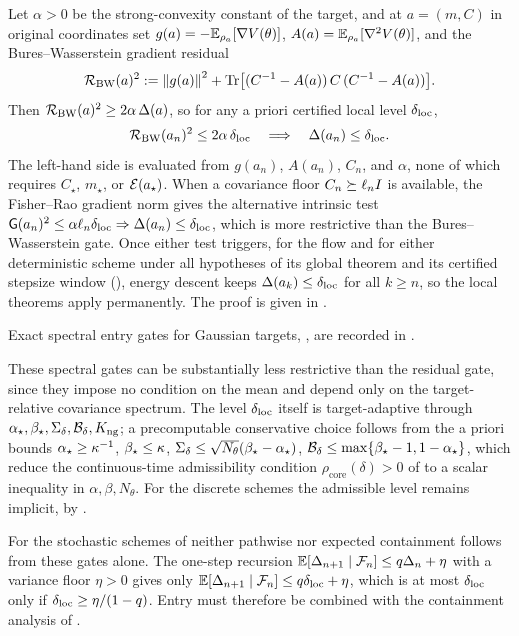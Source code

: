 \begin{proposition}
\label{prop:entry-residual}
Let $\alpha>0$ be the strong-convexity constant of the target, and at $a=(m,C)$ in original
coordinates set $g(a)=-\mathbb{E}_{\rho_a}[\nabla V(\theta)]$, $A(a)=\mathbb{E}_{\rho_a}[\nabla^2V(\theta)]$,
and the Bures--Wasserstein gradient residual
\[
    \mathcal R_{\mathrm{BW}}(a)^2
    :=\left\lVert g(a)\right\rVert^2+\operatorname{Tr}\bigl[(C^{-1}-A(a))\,C\,(C^{-1}-A(a))\bigr].
\]
Then $\mathcal R_{\mathrm{BW}}(a)^2\geq2\alpha\,\Delta(a)$, so for any a priori certified local level
$\delta_{\mathrm{loc}}$,
\[
    \mathcal R_{\mathrm{BW}}(a_n)^2\leq2\alpha\,\delta_{\mathrm{loc}}
    \quad\Longrightarrow\quad
    \Delta(a_n)\leq\delta_{\mathrm{loc}}.
\]
The left-hand side is evaluated from $g(a_n)$, $A(a_n)$, $C_n$, and $\alpha$, none of which
requires $C_\star$, $m_\star$, or $\mathcal{E}(a_\star)$. When a covariance floor $C_n\succeq\ell_nI$
is available, the Fisher--Rao gradient norm gives the alternative intrinsic test
$\mathsf{G}(a_n)^2\leq\alpha\ell_n\delta_{\mathrm{loc}}\Rightarrow\Delta(a_n)\leq\delta_{\mathrm{loc}}$, which
is more restrictive than the Bures--Wasserstein gate. Once either test triggers, for the flow
and for either deterministic scheme under all hypotheses of its global theorem and its
certified stepsize window (), energy descent
keeps $\Delta(a_k)\leq\delta_{\mathrm{loc}}$ for all $k\geq n$, so the local theorems apply
permanently. The proof is given in .
\end{proposition}

Exact spectral entry gates for Gaussian targets, , are recorded in
.

These spectral gates can be substantially less restrictive than the residual gate, since they
impose no condition on the mean and depend only on the target-relative covariance spectrum. The
level $\delta_{\mathrm{loc}}$ itself is target-adaptive through
$\alpha_\star,\beta_\star,\Sigma_\delta,\mathcal B_\delta,K_{\mathrm{ng}}$; a precomputable conservative choice
follows from the a priori bounds $\alpha_\star\geq\kappa^{-1}$, $\beta_\star\leq\kappa$,
$\Sigma_\delta\leq\sqrt{N_\theta}(\beta_\star-\alpha_\star)$,
$\mathcal B_\delta\leq\max\{\beta_\star-1,1-\alpha_\star\}$, which reduce the continuous-time
admissibility condition $\rho_{\mathrm{core}}(\delta)>0$ of  to a scalar
inequality in $\alpha,\beta,N_\theta$. For the discrete schemes the admissible level remains
implicit, by .

For the stochastic schemes of  neither pathwise nor expected containment
follows from these gates alone. The one-step recursion
$\mathbb{E}[\Delta_{n+1}\mid\mathcal{F}_n]\leq q\Delta_n+\eta$ with a variance floor $\eta>0$ gives only
$\mathbb{E}[\Delta_{n+1}\mid\mathcal{F}_n]\leq q\delta_{\mathrm{loc}}+\eta$, which is at most $\delta_{\mathrm{loc}}$ only if
$\delta_{\mathrm{loc}}\geq\eta/(1-q)$. Entry must therefore be combined with the containment analysis
of .

